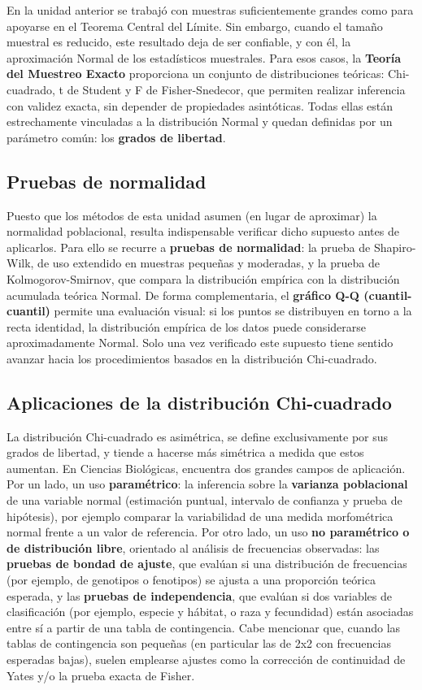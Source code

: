 \documentclass[
  spanish,
  letterpaper,
  DIV=11,
  numbers=noendperiod]{scrreprt}
\begin{document}
En la unidad anterior se trabajó con muestras suficientemente grandes
como para apoyarse en el Teorema Central del Límite. Sin embargo, cuando
el tamaño muestral es reducido, este resultado deja de ser confiable, y
con él, la aproximación Normal de los estadísticos muestrales. Para esos
casos, la \textbf{Teoría del Muestreo Exacto} proporciona un conjunto de
distribuciones teóricas: Chi-cuadrado, t de Student y F de
Fisher-Snedecor, que permiten realizar inferencia con validez exacta,
sin depender de propiedades asintóticas. Todas ellas están estrechamente
vinculadas a la distribución Normal y quedan definidas por un parámetro
común: los \textbf{grados de libertad}.

\subsection{Pruebas de normalidad}\label{pruebas-de-normalidad}

Puesto que los métodos de esta unidad asumen (en lugar de aproximar) la
normalidad poblacional, resulta indispensable verificar dicho supuesto
antes de aplicarlos. Para ello se recurre a \textbf{pruebas de
normalidad}: la prueba de Shapiro-Wilk, de uso extendido en muestras
pequeñas y moderadas, y la prueba de Kolmogorov-Smirnov, que compara la
distribución empírica con la distribución acumulada teórica Normal. De
forma complementaria, el \textbf{gráfico Q-Q (cuantil-cuantil)} permite
una evaluación visual: si los puntos se distribuyen en torno a la recta
identidad, la distribución empírica de los datos puede considerarse
aproximadamente Normal. Solo una vez verificado este supuesto tiene
sentido avanzar hacia los procedimientos basados en la distribución
Chi-cuadrado.

\subsection{Aplicaciones de la distribución
Chi-cuadrado}\label{aplicaciones-de-la-distribuciuxf3n-chi-cuadrado}

La distribución Chi-cuadrado es asimétrica, se define exclusivamente por
sus grados de libertad, y tiende a hacerse más simétrica a medida que
estos aumentan. En Ciencias Biológicas, encuentra dos grandes campos de
aplicación. Por un lado, un uso \textbf{paramétrico}: la inferencia
sobre la \textbf{varianza poblacional} de una variable normal
(estimación puntual, intervalo de confianza y prueba de hipótesis), por
ejemplo comparar la variabilidad de una medida morfométrica normal
frente a un valor de referencia. Por otro lado, un uso \textbf{no
paramétrico o de distribución libre}, orientado al análisis de
frecuencias observadas: las \textbf{pruebas de bondad de ajuste}, que
evalúan si una distribución de frecuencias (por ejemplo, de genotipos o
fenotipos) se ajusta a una proporción teórica esperada, y las
\textbf{pruebas de independencia}, que evalúan si dos variables de
clasificación (por ejemplo, especie y hábitat, o raza y fecundidad)
están asociadas entre sí a partir de una tabla de contingencia. Cabe
mencionar que, cuando las tablas de contingencia son pequeñas (en
particular las de 2x2 con frecuencias esperadas bajas), suelen emplearse
ajustes como la corrección de continuidad de Yates y/o la prueba exacta
de Fisher.
\end{document}
